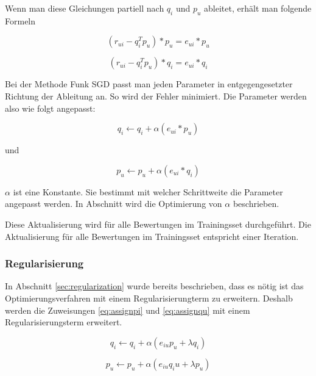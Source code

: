 \documentclass[a4paper, 12pt]{article}
\begin{document}
Wenn man diese Gleichungen partiell nach $q_i$ und $p_u$ ableitet, erhält man folgende Formeln

\begin{equation}
  \label{eq:devqi}
  (r_{ui} - q_i^T p_u) * p_u =  e_{ui} * p_u
\end{equation}

\begin{equation}
  \label{eq:devpu}
    (r_{ui} - q_i^T p_u) * q_i =  e_{ui} * q_i
\end{equation}

Bei der Methode Funk SGD passt man jeden Parameter in entgegengesetzter Richtung der Ableitung an. So wird der Fehler minimiert. Die Parameter werden also wie folgt angepasst:

\begin{equation}
  \label{eq:assignpi}
 q_i \leftarrow q_i + \alpha (e_{ui} * p_u)
\end{equation}

und

\begin{equation}
  \label{eq:assignqu}
 p_u \leftarrow p_u + \alpha (e_{ui} * q_i)
\end{equation}

$\alpha$ ist eine Konstante. Sie bestimmt mit welcher Schrittweite die Parameter angepasst werden. In Abschnitt \label{sec:results} wird die Optimierung von $\alpha$ beschrieben.

Diese Aktualisierung wird für alle Bewertungen im Trainingsset durchgeführt. Die Aktualisierung für alle Bewertungen im Trainingsset entspricht einer Iteration.

\subsubsection{Regularisierung}
\label{sec:regularization2}

In Abschnitt \ref{sec:regularization} wurde bereits beschrieben, dass es nötig ist das Optimierungsverfahren mit einem Regularisierungterm zu erweitern. Deshalb werden die Zuweisungen \ref{eq:assignpi} und \ref{eq:assignqu} mit einem Regularisierungsterm erweitert.

\begin{equation}
  \label{eq:assign2}
  q_i \leftarrow q_i + \alpha (e_{iu} p_u + \lambda q_i)
\end{equation}

\begin{equation}
  \label{eq:assign3}
    p_u \leftarrow p_u + \alpha (e_{iu} q_iu + \lambda p_u)
\end{equation}
\end{document}
